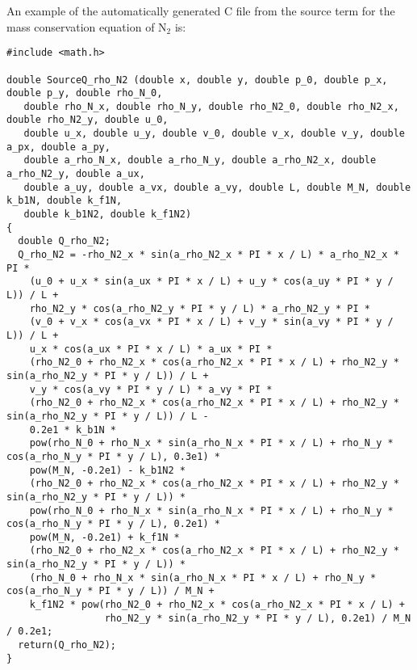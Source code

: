 \documentclass[10pt]{article}
\begin{document}
An example of the automatically generated C file from the source term for the mass conservation equation of N$_2$ is:
\begin{small}
\begin{verbatim}
#include <math.h>

double SourceQ_rho_N2 (double x, double y, double p_0, double p_x, double p_y, double rho_N_0,
   double rho_N_x, double rho_N_y, double rho_N2_0, double rho_N2_x, double rho_N2_y, double u_0,
   double u_x, double u_y, double v_0, double v_x, double v_y, double a_px, double a_py,
   double a_rho_N_x, double a_rho_N_y, double a_rho_N2_x, double a_rho_N2_y, double a_ux,
   double a_uy, double a_vx, double a_vy, double L, double M_N, double k_b1N, double k_f1N,
   double k_b1N2, double k_f1N2)
{
  double Q_rho_N2;
  Q_rho_N2 = -rho_N2_x * sin(a_rho_N2_x * PI * x / L) * a_rho_N2_x * PI *
    (u_0 + u_x * sin(a_ux * PI * x / L) + u_y * cos(a_uy * PI * y / L)) / L +
    rho_N2_y * cos(a_rho_N2_y * PI * y / L) * a_rho_N2_y * PI *
    (v_0 + v_x * cos(a_vx * PI * x / L) + v_y * sin(a_vy * PI * y / L)) / L +
    u_x * cos(a_ux * PI * x / L) * a_ux * PI *
    (rho_N2_0 + rho_N2_x * cos(a_rho_N2_x * PI * x / L) + rho_N2_y * sin(a_rho_N2_y * PI * y / L)) / L +
    v_y * cos(a_vy * PI * y / L) * a_vy * PI *
    (rho_N2_0 + rho_N2_x * cos(a_rho_N2_x * PI * x / L) + rho_N2_y * sin(a_rho_N2_y * PI * y / L)) / L -
    0.2e1 * k_b1N *
    pow(rho_N_0 + rho_N_x * sin(a_rho_N_x * PI * x / L) + rho_N_y * cos(a_rho_N_y * PI * y / L), 0.3e1) *
    pow(M_N, -0.2e1) - k_b1N2 *
    (rho_N2_0 + rho_N2_x * cos(a_rho_N2_x * PI * x / L) + rho_N2_y * sin(a_rho_N2_y * PI * y / L)) *
    pow(rho_N_0 + rho_N_x * sin(a_rho_N_x * PI * x / L) + rho_N_y * cos(a_rho_N_y * PI * y / L), 0.2e1) *
    pow(M_N, -0.2e1) + k_f1N *
    (rho_N2_0 + rho_N2_x * cos(a_rho_N2_x * PI * x / L) + rho_N2_y * sin(a_rho_N2_y * PI * y / L)) *
    (rho_N_0 + rho_N_x * sin(a_rho_N_x * PI * x / L) + rho_N_y * cos(a_rho_N_y * PI * y / L)) / M_N +
    k_f1N2 * pow(rho_N2_0 + rho_N2_x * cos(a_rho_N2_x * PI * x / L) +
                 rho_N2_y * sin(a_rho_N2_y * PI * y / L), 0.2e1) / M_N / 0.2e1;
  return(Q_rho_N2);
}
\end{verbatim}
 \end{small}
\end{document}

